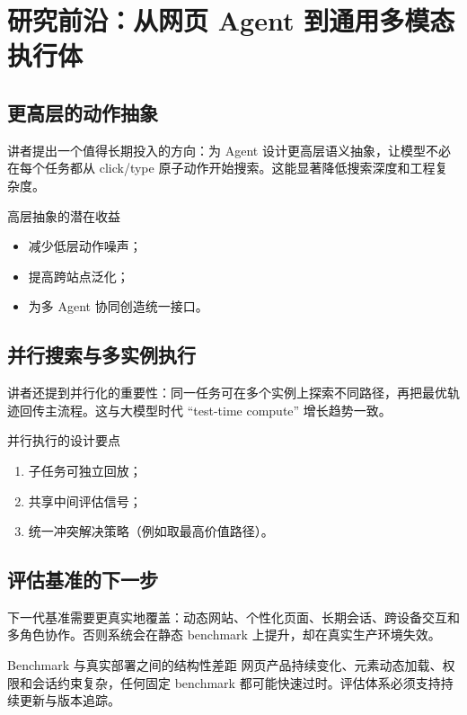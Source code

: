 \documentclass[a4paper]{article}
\begin{document}
\section{研究前沿：从网页 Agent 到通用多模态执行体}

\subsection{更高层的动作抽象}
讲者提出一个值得长期投入的方向：为 Agent 设计更高层语义抽象，让模型不必在每个任务都从 click/type 原子动作开始搜索。这能显著降低搜索深度和工程复杂度。

\begin{importantbox}{高层抽象的潜在收益}
\begin{itemize}
    \item 减少低层动作噪声；
    \item 提高跨站点泛化；
    \item 为多 Agent 协同创造统一接口。
\end{itemize}
\end{importantbox}

\subsection{并行搜索与多实例执行}
讲者还提到并行化的重要性：同一任务可在多个实例上探索不同路径，再把最优轨迹回传主流程。这与大模型时代 ``test-time compute'' 增长趋势一致。

\begin{knowledgebox}{并行执行的设计要点}
\begin{enumerate}
    \item 子任务可独立回放；
    \item 共享中间评估信号；
    \item 统一冲突解决策略（例如取最高价值路径）。
\end{enumerate}
\end{knowledgebox}

\subsection{评估基准的下一步}
下一代基准需要更真实地覆盖：动态网站、个性化页面、长期会话、跨设备交互和多角色协作。否则系统会在静态 benchmark 上提升，却在真实生产环境失效。

\begin{warningbox}{Benchmark 与真实部署之间的结构性差距}
网页产品持续变化、元素动态加载、权限和会话约束复杂，任何固定 benchmark 都可能快速过时。评估体系必须支持持续更新与版本追踪。
\end{warningbox}
\end{document}
